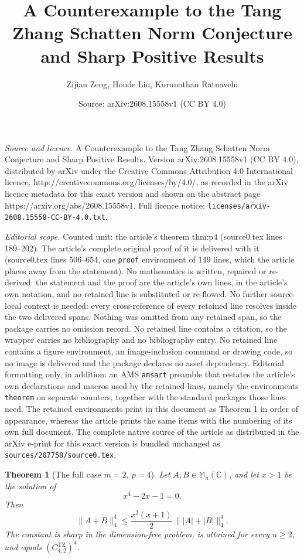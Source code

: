 \documentclass[10pt,a4paper]{amsart}
\title{A Counterexample to the Tang Zhang Schatten Norm Conjecture and Sharp Positive Results}
\author{Zijian Zeng, Houde Liu, Kurunathan Ratnavelu}
\date{Source: arXiv:2608.15558v1 (CC BY 4.0)}
\newtheorem{theorem}{Theorem}
\newcommand{\C}{\mathbb C}
\newcommand{\M}{\mathbb M}
\newcommand{\TZ}{C^{\mathrm{TZ}}}
\begin{document}
\maketitle

\noindent\emph{Source and licence.} A Counterexample to the Tang Zhang Schatten Norm Conjecture and Sharp Positive Results. Version arXiv:2608.15558v1 (CC BY 4.0), distributed by arXiv under the Creative Commons Attribution 4.0 International licence, http://creativecommons.org/licenses/by/4.0/, as recorded in the arXiv licence metadata for this exact version and shown on the abstract page https://arxiv.org/abs/2608.15558v1. Full licence notice: \texttt{licenses/arxiv-2608.15558-CC-BY-4.0.txt}.\par\smallskip

\noindent\textit{Editorial scope.} Counted unit: the article's theorem thm:p4 (source0.tex lines 189--202). The article's complete original proof of it is delivered with it (source0.tex lines 506--654, one \texttt{proof} environment of 149 lines, which the article places away from the statement). No mathematics is written, repaired or re-derived: the statement and the proof are the article's own lines, in the article's own notation, and no retained line is substituted or re-flowed.  No further source-local context is needed: every cross-reference of every retained line resolves inside the two delivered spans.  Nothing was omitted from any retained span, so the package carries no omission record.  No retained line contains a citation, so the wrapper carries no bibliography and no bibliography entry.  No retained line contains a figure environment, an image-inclusion command or drawing code, so no image is delivered and the package declares no asset dependency.  Editorial formatting only, in addition: an AMS \texttt{amsart} preamble that restates the article's own declarations and macros used by the retained lines, namely the environments \texttt{theorem} on separate counters, together with the standard packages those lines need.  The retained environments print in this document as Theorem 1 in order of appearance, whereas the article prints the same items with the numbering of its own full document.  The complete native source of the article as distributed in the arXiv e-print for this exact version is bundled unchanged as \texttt{sources/207758/source0.tex}.
\begin{theorem}[The full case \(m=2,\ p=4\)]\label{thm:p4}
Let \(A,B\in\M_n(\C)\), and let \(x>1\) be the solution of
\[
 x^4-2x-1=0.
\]
Then
\begin{equation}\label{eq:p4-bound}
 \|A+B\|_4^4
 \le
 \frac{x^2(x+1)}2\,\||A|+|B|\|_4^4.
\end{equation}
The constant is sharp in the dimension-free problem, is attained for every
\(n\ge2\), and equals \((\TZ_{4,2})^4\).
\end{theorem}
\end{document}
